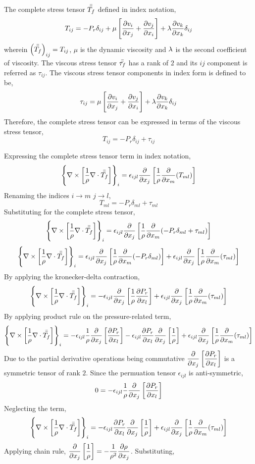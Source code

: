 \documentclass[a4paper, 12pt]{report}
\begin{document}
\begin{center}
The complete stress tensor $\bar{\bar{T_f}}$ defined in index notation,
$$T_{ij} = -P_r\delta_{ij} + \mu\left[\frac{\partial v_i}{\partial x_j} + \frac{\partial v_j}{\partial x_i}\right] + \lambda\frac{\partial v_k}{\partial x_k}\delta_{ij}$$
wherein $\left(\bar{\bar{T_f}}\right)_{ij} = T_{ij}$, $\mu$ is the dynamic viscosity and $\lambda$ is the second coefficient of viscosity. The viscous stress tensor $\bar{\bar{\tau_f}}$ has a rank of $2$ and its $ij$ component is referred as $\tau_{ij}$. The viscous stress tensor components in index form is defined to be,
$$\tau_{ij} = \mu\left[\frac{\partial v_i}{\partial x_j} + \frac{\partial v_j}{\partial x_i}\right] + \lambda\frac{\partial v_k}{\partial x_k}\delta_{ij}$$
Therefore, the complete stress tensor can be expressed in terms of the viscous stress tensor,
$$T_{ij} = -P_r\delta_{ij} + \tau_{ij}$$

Expressing the complete stress tensor term in index notation,
$$\left\{\nabla\times\left[\frac{1}{\rho}\nabla\cdot\bar{\bar{T_f}}\right]\right\}_i = \epsilon_{ijl}\frac{\partial}{\partial x_j}\left[\frac{1}{\rho}\frac{\partial }{\partial x_m}(T_{ml})\right]$$
Renaming the indices $i\to m$ $j\to l$,
$$T_{ml} = -P_r\delta_{ml} + \tau_{ml}$$
Substituting for the complete stress tensor,
$$\left\{\nabla\times\left[\frac{1}{\rho}\nabla\cdot\bar{\bar{T_f}}\right]\right\}_i = \epsilon_{ijl}\frac{\partial}{\partial x_j}\left[\frac{1}{\rho}\frac{\partial }{\partial x_m}(-P_r\delta_{ml} + \tau_{ml})\right]$$
$$\left\{\nabla\times\left[\frac{1}{\rho}\nabla\cdot\bar{\bar{T_f}}\right]\right\}_i = \epsilon_{ijl}\frac{\partial}{\partial x_j}\left[\frac{1}{\rho}\frac{\partial }{\partial x_m}(-P_r\delta_{ml})\right] + \epsilon_{ijl}\frac{\partial}{\partial x_j}\left[\frac{1}{\rho}\frac{\partial }{\partial x_m}(\tau_{ml})\right]$$
By applying the kronecker-delta contraction,
$$\left\{\nabla\times\left[\frac{1}{\rho}\nabla\cdot\bar{\bar{T_f}}\right]\right\}_i = -\epsilon_{ijl}\frac{\partial}{\partial x_j}\left[\frac{1}{\rho}\frac{\partial P_r}{\partial x_l}\right] + \epsilon_{ijl}\frac{\partial}{\partial x_j}\left[\frac{1}{\rho}\frac{\partial }{\partial x_m}(\tau_{ml})\right]$$
By applying product rule on the pressure-related term,
$$\left\{\nabla\times\left[\frac{1}{\rho}\nabla\cdot\bar{\bar{T_f}}\right]\right\}_i = -\epsilon_{ijl}\frac{1}{\rho}\frac{\partial}{\partial x_j}\left[\frac{\partial P_r}{\partial x_l}\right]          -\epsilon_{ijl}\frac{\partial P_r}{\partial x_l}\frac{\partial}{\partial x_j}\left[\frac{1}{\rho}\right]            + \epsilon_{ijl}\frac{\partial}{\partial x_j}\left[\frac{1}{\rho}\frac{\partial }{\partial x_m}(\tau_{ml})\right]$$
Due to the partial derivative operations being commutative $\displaystyle \frac{\partial}{\partial x_j}\left[\frac{\partial P_r}{\partial x_l}\right]$ is a symmetric tensor of rank $2$. Since the permuation tensor $\epsilon_{ijl}$ is anti-symmetric,
$$0 = -\epsilon_{ijl}\frac{1}{\rho}\frac{\partial}{\partial x_j}\left[\frac{\partial P_r}{\partial x_l}\right]$$
Neglecting the term,
$$\left\{\nabla\times\left[\frac{1}{\rho}\nabla\cdot\bar{\bar{T_f}}\right]\right\}_i =          -\epsilon_{ijl}\frac{\partial P_r}{\partial x_l}\frac{\partial}{\partial x_j}\left[\frac{1}{\rho}\right]            + \epsilon_{ijl}\frac{\partial}{\partial x_j}\left[\frac{1}{\rho}\frac{\partial }{\partial x_m}(\tau_{ml})\right]$$
Applying chain rule, $\displaystyle \frac{\partial}{\partial x_j}\left[\frac{1}{\rho}\right] = -\frac{1}{\rho^2}\frac{\partial \rho}{\partial x_j}$. Substituting,

\end{center}
\end{document}
